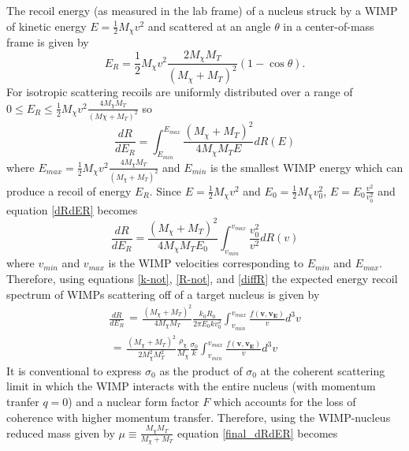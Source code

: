 \documentclass[a4paper,12pt]{article}
\begin{document}
The recoil energy (as measured in the lab frame) of a nucleus struck by a WIMP of kinetic energy $E=\frac{1}{2} M_\chi v^2$ and scattered at an angle $\theta$ in a center-of-mass frame is given by
\begin{equation}
E_R= \frac{1}{2} M_\chi v^2 \frac{2 M_\chi M_T}{(M_\chi + M_T)^2} (1-\cos\theta).
\end{equation}
For isotropic scattering recoils are uniformly distributed over a range of $0 \leq E_R \leq \frac{1}{2} M_\chi v^2 \frac{4 M_\chi M_T}{(M\chi + M_T)^2}$ so
\begin{equation} \label{dRdER}
\frac{dR}{dE_R} = \int_{E_{min}}^{E_{max}} \frac{(M_\chi + M_T)^2}{4 M_\chi M_T E} dR(E)
\end{equation}
where $E_{max} = \frac{1}{2} M_\chi v^2 \frac{4 M_\chi M_T}{(M_\chi + M_T)^2}$ and $E_{min}$ is the smallest WIMP energy which can produce a recoil of energy $E_R$.  Since $E=\frac{1}{2}M_\chi v^2$ and $E_0=\frac{1}{2}M_\chi v_0^2$, $E=E_0 \frac{v^2}{v_0^2}$ and equation \ref{dRdER} becomes
\begin{equation}
\frac{dR}{dE_R} = \frac{(M_\chi + M_T)^2}{4 M_\chi M_T E_0} \int_{v_{min}}^{v_{max}} \frac{v_0^2}{v^2} dR(v)
\end{equation}
where $v_{min}$ and $v_{max}$ is the WIMP velocities corresponding to $E_{min}$ and $E_{max}$.
Therefore, using equations \ref{k-not}, \ref{R-not}, and \ref{diffR} the expected energy recoil spectrum of WIMPs scattering off of a target nucleus is given by
\begin{align} \label{final_dRdER}
\frac{dR}{dE_R} \begin{aligned} = \end{aligned} \frac{(M_\chi + M_T)^2}{4 M_\chi M_T} \frac{k_0 R_0}{2\pi E_0 k v_0^2}  \int_{v_{min}}^{v_{max}} \frac{f(\mathbf{v},\mathbf{v_E})}{v} d^3v \nonumber \\
\begin{aligned} = \end{aligned} \frac{ (M_\chi + M_T)^2}{2M_\chi^2M_T^2} \frac{\rho_\chi}{M_\chi} \frac{\sigma_0}{k} \int_{v_{min}}^{v_{max}} \frac{f(\mathbf{v},\mathbf{v_E})}{v} d^3v
\end{align}
It is conventional to express $\sigma_0$ as the product of $\sigma_0$ at the coherent scattering limit in which the WIMP interacts with the entire nucleus (with momentum tranfer $q=0$) and a nuclear form factor $F$ which accounts for the loss of coherence with higher momentum transfer.  Therefore, using the WIMP-nucleus reduced mass given by $\mu\equiv \frac{M_\chi M_T}{M_\chi + M_T}$ equation \ref{final_dRdER} becomes
\end{document}
